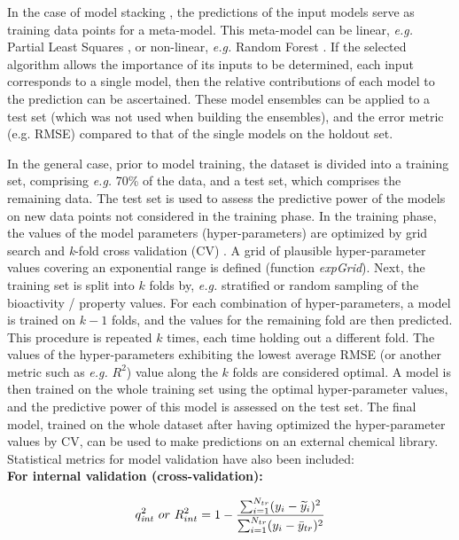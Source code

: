 \documentclass[twoside,a4wide,10pt]{article}
\begin{document}
In the case of model stacking \citep{cortesCOX}, 
the predictions of the input models serve as training data points for a meta-model.
This meta-model can be linear, {\it e.g.} Partial Least Squares \citep{pls},
or non-linear, {\it e.g.} Random Forest \citep{rf}.
If the selected algorithm allows the
importance of its inputs to be determined, each input
corresponds to a single model, then the relative contributions of each 
model to the prediction can be ascertained. 
These model ensembles can be applied to a test set (which was not used when building the ensembles), and the error metric (e.g. RMSE) compared to that of the single models on the holdout set.

In the general case, prior to model training, the dataset is divided into a training set,
comprising {\it e.g.} 70\% of the data, and 
a test set, which comprises the remaining data.
The test set is used to assess the predictive power of the models on new data points
not considered in the training phase.
In the training phase, the values of the model parameters (hyper-parameters) are optimized by grid search and {\it k}-fold cross validation (CV) \citep{overfitting}.
A grid of plausible hyper-parameter values covering an exponential range is defined (function {\it expGrid}).
Next, the training set is split into $k$ folds by, {\it e.g.} stratified or random sampling of the bioactivity / property values.
For each combination of hyper-parameters, 
a model is trained on $k-1$ folds, and the values for the remaining fold are then predicted. 
This procedure is repeated $k$ times, each time holding out a different fold. 
The values of the hyper-parameters exhibiting the lowest average RMSE (or another metric such as {\it e.g.} $R^2$)
value along the $k$ folds are considered optimal. 
A model is then trained on the whole training set using the optimal hyper-parameter values,
and the predictive power of this model is assessed on the test set. 
The final model, trained on the whole dataset after having optimized the hyper-parameter values by CV,
can be used to make predictions on an external chemical library.\\

Statistical metrics for model validation have also been included:\\

{\bf For internal validation (cross-validation):}

\begin{equation}
q_{{\it int}}^{2} \ or \  R_{int}^{2}  = 1 - \frac {\sum_{i=1}^{N_{tr}} (y_{i} - \widetilde{y}_{i})^{2}} {\sum_{i=1}^{N_{tr}} (y_{i} - \bar{y}_{tr})^{2}}
\end{equation}
\end{document}
